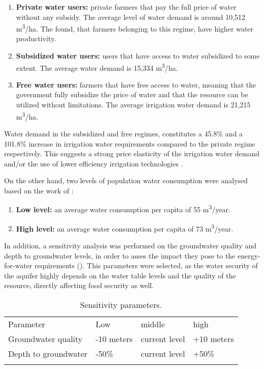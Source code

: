 \begin{enumerate}
	\item \textbf{Private water users:} private farmers that pay the full price of water without any subsidy. The average level of water demand is around 10,512 m\textsuperscript{3}/ha. The \citet{Socioeconomicaspectsirrigation2014} found, that farmers belonging to this regime, have higher water productivity. 
	\item \textbf{Subsidized water users:} users that have access to water subsidized to some extent. The average water demand is 15,334 m\textsuperscript{3}/ha.
	\item \textbf{Free water users:} farmers that have free access to water, meaning that the government fully subsidize the price of water and that the resource can be utilized without limitations. The average irrigation water demand is 21,215 m\textsuperscript{3}/ha.
\end{enumerate}

Water demand in the subsidized and free regimes, constitutes a 45.8\% and a 101.8\% increase in irrigation water requirements compared to the private regime respectively. This suggests a strong price elasticity of the irrigation water demand and/or the use of lower efficiency irrigation technologies \cite{Socioeconomicaspectsirrigation2014}.

On the other hand, two levels of population water consumption were analysed based on the work of \citet{Householdwaterconsumption2014}:

\begin{enumerate}
    \item \textbf{Low level:} an average water consumption per capita of 55 m\textsuperscript{3}/year.
    \item \textbf{High level:} an average water consumption per capita of 73 m\textsuperscript{3}/year.
\end{enumerate}

In addition, a sensitivity analysis was performed on the groundwater quality and depth to groundwater levels, in order to asses the impact they pose to the energy-for-water requirements (). This parameters were selected, as the water security of the aquifer highly depends on the water table levels and the quality of the resource, directly affecting food security as well.

\begin{table}[!ht]
	\caption{\label{tbl:sensitivy}Sensitivity parameters.}
	\begin{indented}
	\item[]\begin{tabular}{@{}l l l l}
		\br
		Parameter & Low & middle & high\\
		\mr
		Groundwater quality & -10 meters & current level & +10 meters\\
		Depth to groundwater & -50\% & current level & +50\%\\
		\br
	\end{tabular}
	\end{indented}
\end{table}

